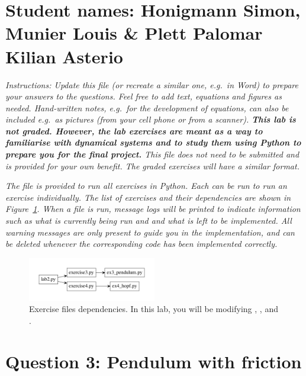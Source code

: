 \documentclass{cmc}
\begin{document}
\pagestyle{fancy}
 

\section*{Student names: Honigmann Simon, Munier Louis \& Plett Palomar Kilian Asterio}

\textit{Instructions: Update this file (or recreate a similar one, e.g.\ in
  Word) to prepare your answers to the questions. Feel free to add text,
  equations and figures as needed. Hand-written notes, e.g.\ for the development
  of equations, can also be included e.g.\ as pictures (from your cell phone or
  from a scanner).  \textbf{This lab is not graded. However, the lab exercises
    are meant as a way to familiarise with dynamical systems and to study them
    using Python to prepare you for the final project.} This file does not need
  to be submitted and is provided for your own benefit. The graded exercises
  will have a similar format.}

\textit{The file  is provided to run all exercises in
  Python. Each  can be run to run an exercise
  individually. The list of exercises and their dependencies are shown in
  Figure~\ref{fig:files}. When a file is run, message logs will be printed to
  indicate information such as what is currently being run and and what is left
  to be implemented. All warning messages are only present to guide you in the
  implementation, and can be deleted whenever the corresponding code has been
  implemented correctly.}

\begin{figure}[ht]
  \centering \includegraphics[width=0.5\textwidth]{figures/files}
  \caption{\label{fig:files} Exercise files dependencies. In this lab, you will
    be modifying , ,
     and .}
\end{figure}

\section*{Question 3: Pendulum with friction}
\end{document}
